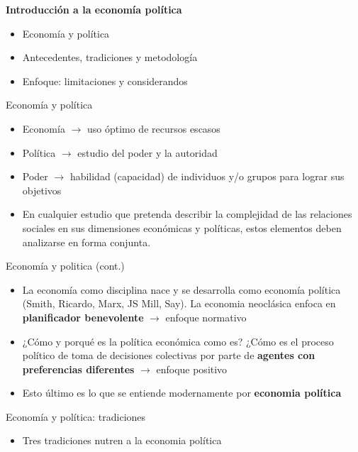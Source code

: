 \documentclass[
  ignorenonframetext,
]{beamer}
\providecommand{\tightlist}{%
  \setlength{\itemsep}{0pt}\setlength{\parskip}{0pt}}\usepackage{longtable,booktabs,array}
\begin{document}
\begin{frame}{\textbf{Introducción a la economía política}}
\protect\hypertarget{introducciuxf3n-a-la-economuxeda-poluxedtica}{}
\begin{itemize}
\tightlist
\item
  Economía y política
\item
  Antecedentes, tradiciones y metodología
\item
  Enfoque: limitaciones y considerandos
\end{itemize}

\begin{block}{Economía y política}
\protect\hypertarget{economuxeda-y-poluxedtica}{}
\begin{itemize}
\tightlist
\item
  Economía \(\longrightarrow\) uso óptimo de recursos escasos
\item
  Política \(\longrightarrow\) estudio del poder y la autoridad
\item
  Poder \(\longrightarrow\) habilidad (capacidad) de individuos y/o
  grupos para lograr sus objetivos
\item
  En cualquier estudio que pretenda describir la complejidad de las
  relaciones sociales en sus dimensiones económicas y políticas, estos
  elementos deben analizarse en forma conjunta.
\end{itemize}
\end{block}

\begin{block}{Economía y politica (cont.)}
\protect\hypertarget{economuxeda-y-politica-cont.}{}
\begin{itemize}
\tightlist
\item
  La economía como disciplina nace y se desarrolla como economía
  política (Smith, Ricardo, Marx, JS Mill, Say). La economia neoclásica
  enfoca en \textbf{planificador benevolente} \(\longrightarrow\)
  enfoque normativo
\item
  ¿Cómo y porqué es la política económica como es? ¿Cómo es el proceso
  político de toma de decisiones colectivas por parte de \textbf{agentes
  con preferencias diferentes} \(\longrightarrow\) enfoque positivo
\item
  Esto último es lo que se entiende modernamente por \textbf{economia
  política}
\end{itemize}
\end{block}

\begin{block}{Economía y política: tradiciones}
\protect\hypertarget{economuxeda-y-poluxedtica-tradiciones}{}
\begin{itemize}
\tightlist
\item
  Tres tradiciones nutren a la economia política


\end{itemize}
\end{block}
\end{frame}
\end{document}
